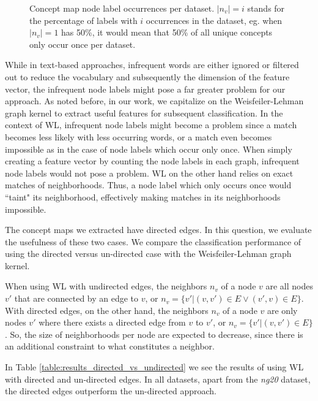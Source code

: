 \begin{figure}[htb!]
	\caption[Statistics: Distribution concept occurrence]{Concept map node label occurrences per dataset. $|n_v| = i$ stands for the percentage of labels with $i$ occurrences in the dataset, eg. when $|n_v| = 1$ has 50\%, it would mean that 50\% of all unique concepts only occur once per dataset.}\label{fig:percentage_distribution_concept_occurrences}
\end{figure}

While in text-based approaches, infrequent words are either ignored or filtered out to reduce the vocabulary and subsequently the dimension of the feature vector, the infrequent node labels might pose a far greater problem for our approach.
As noted before, in our work, we capitalize on the Weisfeiler-Lehman graph kernel to extract useful features for subsequent classification.
In the context of WL, infrequent node labels might become a problem since a match becomes less likely with less occurring words, or a match even becomes impossible as in the case of node labels which occur only once.
When simply creating a feature vector by counting the node labels in each graph, infrequent node labels would not pose a problem.
WL on the other hand relies on exact matches of neighborhoods.
Thus, a node label which only occurs once would ``taint" its neighborhood, effectively making matches in its neighborhoods impossible.

The concept maps we extracted have directed edges.
In this question, we evaluate the usefulness of these two cases.
We compare the classification performance of using the directed versus un-directed case with the Weisfeiler-Lehman graph kernel.

When using WL with undirected edges, the neighbors $n_v$ of a node $v$ are all nodes $v'$ that are connected by an edge to $v$, or $n_v = \{v' | (v, v') \in E \lor (v', v ) \in E \}$.
With directed edges, on the other hand, the neighbors $n_v$ of a node $v$ are only nodes $v'$ where there exists a directed edge from $v$ to $v'$, or $n_v = \{v' | (v, v') \in E \}$.
So, the size of neighborhoods per node are expected to decrease, since there is an additional constraint to what constitutes a neighbor.

In Table \ref{table:results_directed_vs_undirected} we see the results of using WL with directed and un-directed edges.
In all datasets, apart from the \textit{ng20} dataset, the directed edges outperform the un-directed approach.

